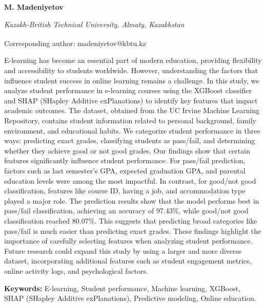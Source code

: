 
\begin{articleheader}

{\bfseries M. Madeniyetov}
\end{articleheader}

\begin{affiliation}
\emph{Kazakh-British Technical University, Almaty, Kazakhstan}

\raggedright \textsuperscript{\envelope }Corresponding author: madeniyetov@kbtu.kz
\end{affiliation}

E-learning has become an essential part of modern education, providing
flexibility and accessibility to students worldwide. However,
understanding the factors that influence student success in online
learning remains a challenge. In this study, we analyze student
performance in e-learning courses using the XGBoost classifier and SHAP
(SHapley Additive exPlanations) to identify key features that impact
academic outcomes. The dataset, obtained from the UC Irvine Machine
Learning Repository, contains student information related to personal
background, family environment, and educational habits. We categorize
student performance in three ways: predicting exact grades, classifying
students as pass/fail, and determining whether they achieve good or not
good grades. Our findings show that certain features significantly
influence student performance. For pass/fail prediction, factors such as
last semester's GPA, expected graduation GPA, and parental education
levels were among the most impactful. In contrast, for good/not good
classification, features like course ID, having a job, and accommodation
type played a major role. The prediction results show that the model
performs best in pass/fail classification, achieving an accuracy of
97.43\%, while good/not good classification reached 80.07\%. This
suggests that predicting broad categories like pass/fail is much easier
than predicting exact grades. These findings highlight the importance of
carefully selecting features when analyzing student performance. Future
research could expand this study by using a larger and more diverse
dataset, incorporating additional features such as student engagement
metrics, online activity logs, and psychological factors.

{\bfseries Keywords:} E-learning, Student performance, Machine learning,
XGBoost, SHAP (SHapley Additive exPlanations), Predictive modeling,
Online education.

